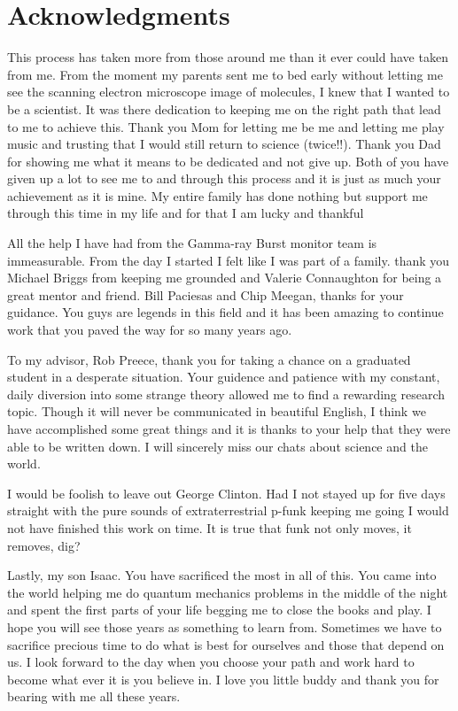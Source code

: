 \chapter*{Acknowledgments}

This process has taken more from those around me than it ever could
have taken from me. From the moment my parents sent me to bed early
without letting me see the scanning electron microscope image of
molecules, I knew that I wanted to be a scientist. It was there
dedication to keeping me on the right path that lead to me to achieve
this. Thank you Mom for letting me be me and letting me play music and
trusting that I would still return to science (twice!!). Thank you Dad
for showing me what it means to be dedicated and not give up. Both of
you have given up a lot to see me to and through this process and it
is just as much your achievement as it is mine. My entire family has
done nothing but support me through this time in my life and for that
I am lucky and thankful

All the help I have had from the Gamma-ray Burst monitor team is
immeasurable. From the day I started I felt like I was part of a
family. thank you Michael Briggs from keeping me grounded and Valerie
Connaughton for being a great mentor and friend. Bill Paciesas and
Chip Meegan, thanks for your guidance. You guys are legends in this
field and it has been amazing to continue work that you paved the way
for so many years ago.

To my advisor, Rob Preece, thank you for taking a chance on a
graduated student in a desperate situation. Your guidence and
patience with my constant, daily diversion into some strange theory allowed
me to find a rewarding research topic. Though it will never be
communicated in beautiful English, I think we have accomplished some
great things and it is thanks to your help that they were able to be
written down. I will sincerely miss our chats about science and the
world.

I would be foolish to leave out George Clinton. Had I not stayed up
for five days straight with the pure sounds of extraterrestrial p-funk
keeping me going I would not have finished this work on time. It is
true that funk not only moves, it removes, dig?

Lastly, my son Isaac. You have sacrificed the most in all of this. You
came into the world helping me do quantum mechanics problems in the
middle of the night and spent the first parts of your life begging me
to close the books and play. I hope you will see those years as
something to learn from. Sometimes we have to sacrifice precious time
to do what is best for ourselves and those that depend on us. I look
forward to the day when you choose your path and work hard to become
what ever it is you believe in. I love you little buddy and thank you
for bearing with me all these years.



